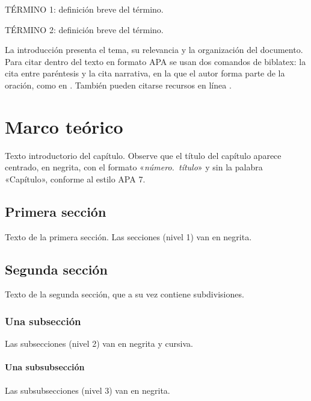 \documentclass[12pt,oneside,onehalfspace,apa,spanish]{upbthesis}
\begin{document}
\begin{gloss}
TÉRMINO 1: definición breve del término.

TÉRMINO 2: definición breve del término.
\end{gloss}

\mainmatter

\begin{introduction}
La introducción presenta el tema, su relevancia y la organización del documento.
Para citar dentro del texto en formato APA se usan dos comandos de biblatex:
la cita entre paréntesis \parencite{perez2021} y la cita narrativa, en la que
el autor forma parte de la oración, como en \textcite{rodriguez2022}. También
pueden citarse recursos en línea \parencite{lopez2023}.
\end{introduction}

\chapter{Marco teórico}
Texto introductorio del capítulo. Observe que el título del capítulo aparece
centrado, en negrita, con el formato «\textit{número.\ título}» y sin la
palabra «Capítulo», conforme al estilo APA 7.

\section{Primera sección}
Texto de la primera sección. Las secciones (nivel 1) van en negrita.

\section{Segunda sección}
Texto de la segunda sección, que a su vez contiene subdivisiones.

\subsection{Una subsección}
Las subsecciones (nivel 2) van en negrita y cursiva.

\subsubsection{Una subsubsección}
Las subsubsecciones (nivel 3) van en negrita.
\end{document}
